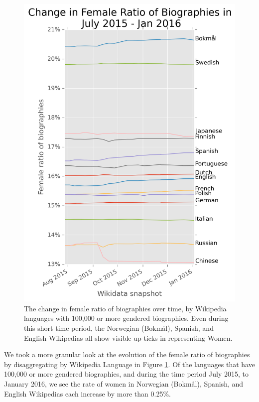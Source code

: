 \documentclass{sig-alternate-05-2015}
\begin{document}
\begin{figure}
\includegraphics[scale=0.6]{figures/changefrb.png} 
\caption{The change in female ratio of biographies over time, by Wikipedia languages with 100,000 or more gendered biographies. Even during this short time period, the Norwegian (Bokm\aa l), Spanish, and English Wikipedias all show visible up-ticks in representing Women.}
\label{fig:changefrb}
\end{figure}

We took a more granular look at the evolution of the female ratio of biographies by disaggregating by Wikipedia Language in Figure \ref{fig:changefrb}. Of the languages that have 100,000 or more gendered biographies, and during the time period July 2015, to January 2016, we see the rate of women in Norwegian (Bokm\aa l), Spanish, and English Wikipedias each increase by more than 0.25\%.
\end{document}
